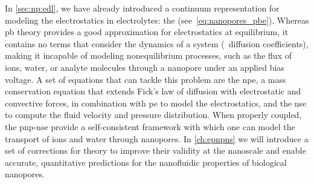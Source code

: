 In \cref{sec:np:edl}, we have already introduced a continuum representation for modeling the electrostatics in
electrolytes: the  (see~\cref{eq:nanopores_pbe}). Whereas \gls{pb} theory provides a good
approximation for electrostatics at equilibrium, it contains no terms that consider the dynamics of a system
(\eg~diffusion coefficients), making it incapable of modeling nonequilibrium processes, such as the flux of
ions, water, or analyte molecules through a nanopore under an applied bias voltage. A set of equations that
can tackle this problem are the \gls{npe}, a mass conservation equation that extends Fick's law of diffusion
with electrostatic and convective forces, in combination with \gls{pe} to model the electrostatics, and the
\gls{nse} to compute the fluid velocity and pressure distribution. When properly coupled, the \gls{pnp-nse}
provide a self-consistent framework with which one can model the transport of ions and water through
nanopores. In \cref{ch:epnpns} we will introduce a set of corrections for  theory to
improve their validity at the nanoscale and enable accurate, quantitative predictions for the nanofluidic
properties of biological nanopores.

